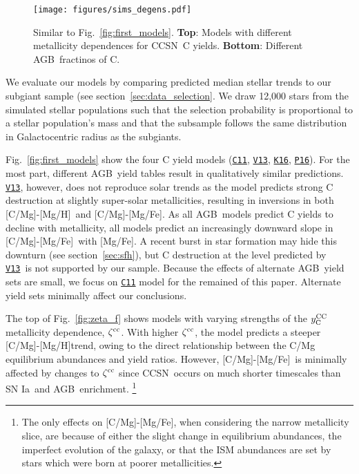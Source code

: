 \documentclass[fleqn,
usenatbib]{mnras}
\newcommand{\cxi}{\texttt{\hyperlink{C11}{C11}}}
\newcommand{\pxvi}{\texttt{\hyperlink{P16}{P16}}}
\newcommand{\kxvi}{\texttt{\hyperlink{K16}{K16}}}
\newcommand{\vxiii}{\texttt{\hyperlink{V13}{V13}}}
\newcommand{\agb}{AGB}
\newcommand{\cc}{CCSN}
\newcommand{\ia}{SN Ia}
\newcommand{\caah}{[C/Mg]-[Mg/H]}
\newcommand{\caafe}{[C/Mg]-[Mg/Fe]}
\newcommand{\Ycc}{\ensuremath{y_{\rm C}^{\rm CC}}}
\begin{document}
\begin{figure}
\texttt{[image: figures/sims\_degens.pdf]}

\caption[]{
    Similar to Fig.~\ref{fig:first_models}. 
    \textbf{Top}: Models with different metallicity dependences for  \cc\ C yields. \textbf{Bottom}: Different \agb\ fractinos of C.
}
\label{fig:sims_degens}
\end{figure}




We evaluate our models by comparing predicted median stellar trends to our subgiant sample (see section~\ref{sec:data_selection}. 
We draw 12,000 stars from the simulated stellar populations such that the selection probability is proportional to a stellar population's mass and that the subsample follows the same distribution in Galactocentric radius as the subgiants. 


Fig.~\ref{fig:first_models} show the four C yield models (\cxi, \vxiii, \kxvi, \pxvi). For the most part, different \agb\ yield tables result in qualitatively similar predictions. \vxiii, however, does not reproduce solar trends as the model predicts strong C destruction at slightly super-solar metallicities, resulting in inversions in both \caah\ and \caafe. 
As all \agb\ models predict C yields to decline with metallicity, all models predict an increasingly downward slope in \caafe\ with [Mg/Fe]. A recent burst in star formation may hide this downturn (see section~\ref{sec:sfh}), but C destruction at the level predicted by \vxiii\ is not supported by our sample. 
Because the effects of alternate \agb\ yield sets are small, we focus on \cxi{} model for the remained of this paper. Alternate yield sets minimally affect our conclusions. 



The top of Fig.~\ref{fig:zeta_f} shows models with varying strengths of the $\Ycc$ metallicity dependence, $\zeta^{\rm cc}$. With higher $\zeta^{\rm cc}$, the model predicts a steeper \caah trend, owing to the direct relationship between the C/Mg equilibrium abundances and yield ratios. 
However, \caafe~is minimally affected by changes to $\zeta^{\rm cc}$ since \cc\ occurs on much shorter timescales than \ia\ and \agb\ enrichment.%
\footnote{The only effects on \caafe, when considering the narrow metallicity slice, are because of either the slight change in equilibrium abundances, the imperfect evolution of the galaxy, or that the ISM abundances are set by stars which were born at poorer metallicities. }
\end{document}
